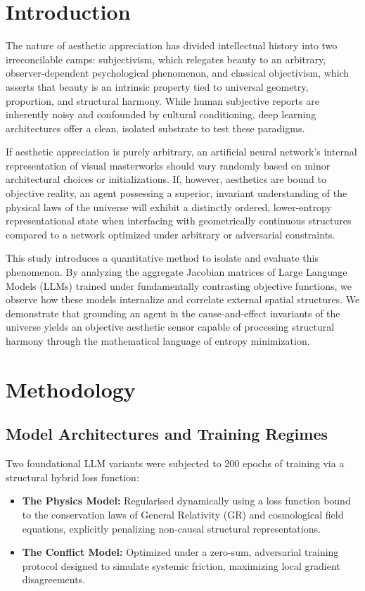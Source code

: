 \documentclass[11pt,twocolumn]{article}
\begin{document}
\section{Introduction}
The nature of aesthetic appreciation has divided intellectual history into two irreconcilable camps: subjectivism, which relegates beauty to an arbitrary, observer-dependent psychological phenomenon, and classical objectivism, which asserts that beauty is an intrinsic property tied to universal geometry, proportion, and structural harmony. While human subjective reports are inherently noisy and confounded by cultural conditioning, deep learning architectures offer a clean, isolated substrate to test these paradigms. 

If aesthetic appreciation is purely arbitrary, an artificial neural network's internal representation of visual masterworks should vary randomly based on minor architectural choices or initializations. If, however, aesthetics are bound to objective reality, an agent possessing a superior, invariant understanding of the physical laws of the universe will exhibit a distinctly ordered, lower-entropy representational state when interfacing with geometrically continuous structures compared to a network optimized under arbitrary or adversarial constraints.

This study introduces a quantitative method to isolate and evaluate this phenomenon. By analyzing the aggregate Jacobian matrices of Large Language Models (LLMs) trained under fundamentally contrasting objective functions, we observe how these models internalize and correlate external spatial structures. We demonstrate that grounding an agent in the cause-and-effect invariants of the universe yields an objective aesthetic sensor capable of processing structural harmony through the mathematical language of entropy minimization.

\section{Methodology}

\subsection{Model Architectures and Training Regimes}
Two foundational LLM variants were subjected to 200 epochs of training via a structural hybrid loss function:
\begin{itemize}
    \item \textbf{The Physics Model:} Regularised dynamically using a loss function bound to the conservation laws of General Relativity (GR) and cosmological field equations, explicitly penalizing non-causal structural representations.
    \item \textbf{The Conflict Model:} Optimized under a zero-sum, adversarial training protocol designed to simulate systemic friction, maximizing local gradient disagreements.
\end{itemize}
\end{document}
